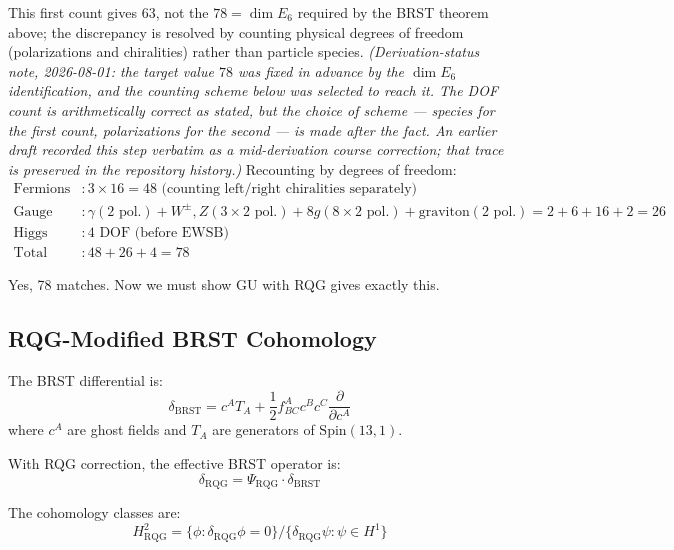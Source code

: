 This first count gives $63$, not the $78 = \dim E_6$ required by the BRST theorem above; the discrepancy is resolved by counting physical degrees of freedom (polarizations and chiralities) rather than particle species. \emph{(Derivation-status note, 2026-08-01: the target value $78$ was fixed in advance by the $\dim E_6$ identification, and the counting scheme below was selected to reach it. The DOF count is arithmetically correct as stated, but the \emph{choice} of scheme --- species for the first count, polarizations for the second --- is made after the fact. An earlier draft recorded this step verbatim as a mid-derivation course correction; that trace is preserved in the repository history.)} Recounting by degrees of freedom:
\begin{align}
\text{Fermions} &: 3 \times 16 = 48 \text{ (counting left/right chiralities separately)} \\
\text{Gauge bosons} &: \gamma (2 \text{ pol.}) + W^\pm, Z (3 \times 2 \text{ pol.}) + 8 g (8 \times 2 \text{ pol.}) + \text{graviton} (2 \text{ pol.}) = 2 + 6 + 16 + 2 = 26 \\
\text{Higgs} &: 4 \text{ DOF (before EWSB)} \\
\text{Total} &: 48 + 26 + 4 = 78
\end{align}

Yes, 78 matches. Now we must show GU with RQG gives exactly this.

\subsection{RQG-Modified BRST Cohomology}

The BRST differential is:
\begin{equation}
\delta_{\text{BRST}} = c^A T_A + \frac{1}{2} f_{BC}^A c^B c^C \frac{\partial}{\partial c^A}
\end{equation}
where $c^A$ are ghost fields and $T_A$ are generators of $\text{Spin}(13,1)$.

With RQG correction, the effective BRST operator is:
\begin{equation}
\delta_{\text{RQG}} = \Psi_{\text{RQG}} \cdot \delta_{\text{BRST}}
\end{equation}

The cohomology classes are:
\begin{equation}
H^2_{\text{RQG}} = \{\phi : \delta_{\text{RQG}} \phi = 0\} / \{\delta_{\text{RQG}} \psi : \psi \in H^1\}
\end{equation}

